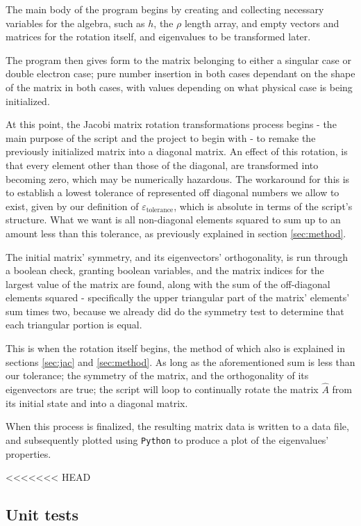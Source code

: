 \documentclass[11pt,a4paper,notitlepage]{article}
\begin{document}
The main body of the program begins by creating and collecting necessary variables for the algebra, such as $h$, the $\rho$ length array, and empty vectors and matrices for the rotation itself, and eigenvalues to be transformed later.

The program then gives form to the matrix belonging to either a singular case or double electron case; pure number insertion in both cases dependant on the shape of the matrix in both cases, with values depending on what physical case is being initialized.

At this point, the Jacobi matrix rotation transformations process begins - the main purpose of the script and the project to begin with - to remake the previously initialized matrix into a diagonal matrix. An effect of this rotation, is that every element other than those of the diagonal, are transformed into becoming zero, which may be numerically hazardous. The workaround for this is to establish a lowest tolerance of represented off diagonal numbers we allow to exist, given by our definition of $\varepsilon_\text{tolerance}$, which is absolute in terms of the script's structure. What we want is all non-diagonal elements squared to sum up to an amount less than this tolerance, as previously explained in section \ref{sec:method}.

The initial matrix' symmetry, and its eigenvectors' orthogonality, is run through a boolean check, granting boolean variables, and the matrix indices for the largest value of the matrix are found, along with the sum of the off-diagonal elements squared - specifically the upper triangular part of the matrix' elements' sum times two, because we already did do the symmetry test to determine that each triangular portion is equal.

This is when the rotation itself begins, the method of which also is explained in sections \ref{sec:jac} and \ref{sec:method}. As long as the aforementioned sum is less than our tolerance; the symmetry of the matrix, and the orthogonality of its eigenvectors are true; the script will loop to continually rotate the matrix $\hat{A}$ from its initial state and into a diagonal matrix.

When this process is finalized, the resulting matrix data is written to a data file, and subsequently plotted using \verb|Python| to produce a plot of the eigenvalues' properties.

<<<<<<< HEAD
\subsection{Unit tests} \label{sec:unit tests}
\end{document}
